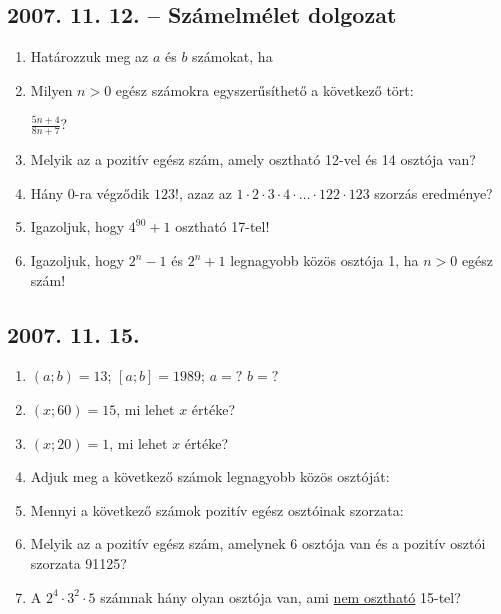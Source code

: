 \subsection*{2007. 11. 12. -- Számelmélet dolgozat}
\begin{enumerate}
\item Határozzuk meg az $a$ és $b$ számokat, ha
\item Milyen $n>0$ egész számokra egyszerűsíthető a következő tört:

$\displaystyle{\frac{5n+4}{8n+7}}$?
\item Melyik az a pozitív egész szám, amely osztható 12-vel és 14 osztója van?
\item Hány 0-ra végződik $123!$, azaz az $1\cdot2\cdot3\cdot4\cdot\ldots\cdot122\cdot123$ szorzás eredménye?
\item Igazoljuk, hogy $4^{90}+1$ osztható 17-tel!
\item Igazoljuk, hogy $2^n-1$ és $2^n+1$ legnagyobb közös osztója 1, ha $n>0$ egész szám!
\end{enumerate}


\subsection*{2007. 11. 15.}
\begin{enumerate}
\item $(a;b)=13$; $[a;b]=1989$; $a=?$ $b=?$
\item $(x;60)=15$, mi lehet $x$ értéke?
\item $(x;20)=1$, mi lehet $x$ értéke?
\item Adjuk meg a következő számok legnagyobb közös osztóját:
\item Mennyi a következő számok pozitív egész osztóinak szorzata:
\item Melyik az a pozitív egész szám, amelynek 6 osztója van és a pozitív osztói szorzata 91125?
\item A $2^4\cdot3^2\cdot5$ számnak hány olyan osztója van, ami \underline{nem osztható} 15-tel?
\end{enumerate}


